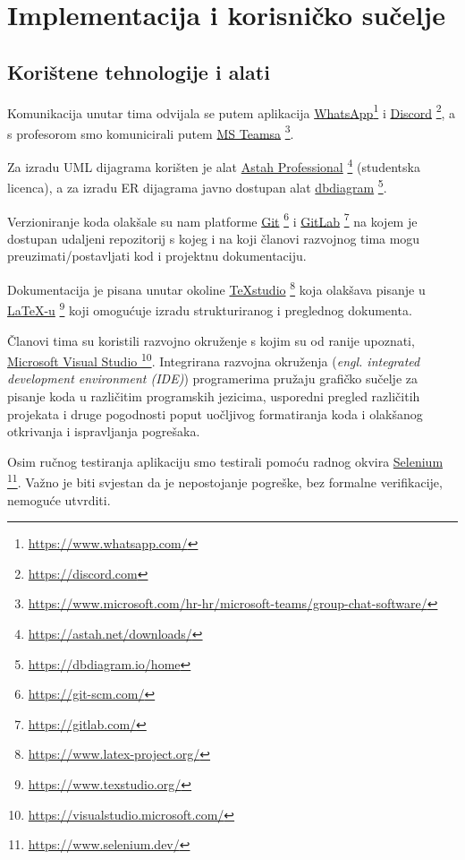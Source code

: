 \chapter{Implementacija i korisničko sučelje}
		
		
		\section{Korištene tehnologije i alati}
		
		
			Komunikacija unutar tima odvijala se putem aplikacija \underline{WhatsApp}\footnote {\url{https://www.whatsapp.com/}} i \underline{Discord} \footnote{\url{https://discord.com}}, a s profesorom smo komunicirali putem \underline{MS Teamsa} \footnote{\url{https://www.microsoft.com/hr-hr/microsoft-teams/group-chat-software/}}.
			
			
			Za izradu UML dijagrama korišten je alat \underline{Astah Professional} \footnote {\url{https://astah.net/downloads/}} (studentska licenca), a za izradu ER dijagrama javno dostupan alat \underline{dbdiagram} \footnote {\url{https://dbdiagram.io/home}}.
			
			Verzioniranje koda olakšale su nam platforme \underline{Git} \footnote {\url{https://git-scm.com/}}  i \underline{GitLab} \footnote {\url{https://gitlab.com/}}  na kojem je dostupan udaljeni repozitorij s kojeg i na koji članovi razvojnog tima mogu preuzimati/postavljati kod i projektnu dokumentaciju.
			
			 Dokumentacija je pisana unutar okoline \underline{TeXstudio} \footnote {\url{https://www.latex-project.org/}} koja olakšava pisanje u \underline{LaTeX-u} \footnote {\url{https://www.texstudio.org/}} koji omogućuje izradu strukturiranog i preglednog dokumenta.
			
		
			Članovi tima su koristili razvojno okruženje s kojim su od ranije upoznati, \underline{Microsoft Visual Studio } \footnote {\url{https://visualstudio.microsoft.com/}}. Integrirana razvojna okruženja (\textit{engl. integrated development environment (IDE)}) programerima pružaju grafičko sučelje za pisanje koda u različitim programskih jezicima, usporedni pregled različitih projekata i druge pogodnosti poput uočljivog formatiranja koda i olakšanog otkrivanja i ispravljanja pogrešaka. 
			
			Osim ručnog testiranja aplikaciju smo testirali pomoću radnog okvira \underline{Selenium} \footnote {\url{https://www.selenium.dev/}}. Važno je biti svjestan da je nepostojanje pogreške, bez formalne verifikacije, nemoguće utvrditi.
			
